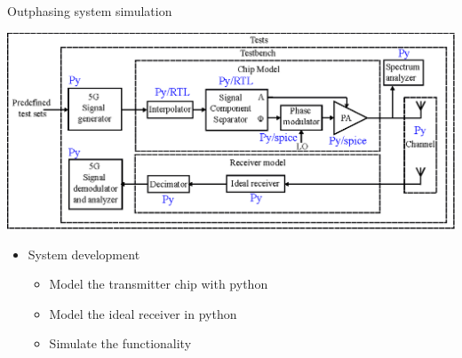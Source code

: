 \documentclass{sdkslides}
\begin{document}
\subsection*{\sectionname}
\begin{frame}[c]
    \frametitle{\sectionname}
    \begin{block}{Outphasing system simulation}
        \begin{center}
            \includegraphics[width=\textwidth]{Pics/outphasing_model.eps}
        \end{center}
    \end{block}    \begin{itemize}
        \item System development
            \begin{itemize}
                \item  Model the transmitter chip with python
                \item  Model the ideal receiver in python
                \item  Simulate the functionality
            \end{itemize}
    \end{itemize}
\end{frame}
\end{document}
